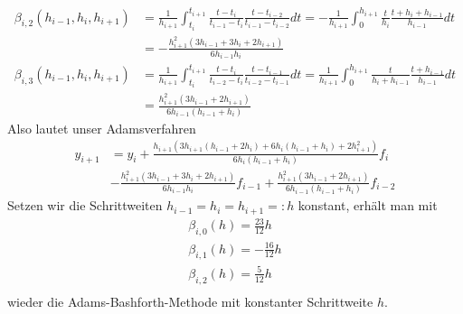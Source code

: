 \begin{solution}
\begin{align*}
  \beta_{i,2}(h_{i-1},h_i,h_{i+1}) &= \frac{1}{h_{i+1}}\int_{t_i}^{t_{i + 1}}
  \frac{t - t_{i}}{t_{i - 1} - t_{i}}\frac{t - t_{i - 2}}{t_{i - 1} - t_{i - 2}}dt
  = -\frac{1}{h_{i+1}}\int_{0}^{h_{i+1}}
  \frac{t}{h_i}\frac{t + h_i + h_{i-1}}{h_{i-1}}dt \\
  &= -\frac{h_{i+1}^2(3h_{i-1} + 3h_i + 2h_{i+1})}{6h_{i-1}h_i} \\
  \beta_{i,3}(h_{i-1},h_i,h_{i+1}) &= \frac{1}{h_{i+1}}\int_{t_i}^{t_{i + 1}}
  \frac{t - t_{i}}{t_{i - 2} - t_{i}}\frac{t - t_{i - 1}}{t_{i-2} - t_{i - 1}}dt
  = \frac{1}{h_{i+1}}\int_{0}^{h_{i+1}}
  \frac{t}{h_i + h_{i-1}}\frac{t + h_{i-1}}{h_{i-1}}dt\\
  &= \frac{h_{i+1}^2(3h_{i-1} + 2h_{i+1})}{6h_{i-1}(h_{i-1} + h_i)}
\end{align*}
Also lautet unser Adamsverfahren
\begin{align*}
  y_{i+1} &= y_i +
  \frac{h_{i+1}(3h_{i+1}(h_{i-1} + 2h_i) + 6h_i(h_{i-1} + h_i) + 2h_{i+1}^2)}{6h_i(h_{i-1} + h_i)}
  f_i \\
  &-\frac{h_{i+1}^2(3h_{i-1} + 3h_i + 2h_{i+1})}{6h_{i-1}h_i}f_{i-1} +
  \frac{h_{i+1}^2(3h_{i-1} + 2h_{i+1})}{6h_{i-1}(h_{i-1} + h_i)}f_{i-2}
\end{align*}
Setzen wir die Schrittweiten $h_{i-1} = h_i = h_{i+1} =: h$ konstant, erhält man mit
\begin{align*}
  \beta_{i,0}(h) = \frac{23}{12}h \\
  \beta_{i,1}(h) = -\frac{16}{12}h \\
  \beta_{i,2}(h) = \frac{5}{12}h \\
\end{align*}
wieder die Adams-Bashforth-Methode mit konstanter Schrittweite $h$.
\end{solution}
